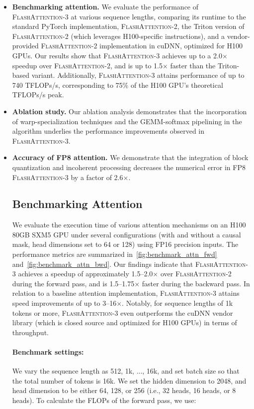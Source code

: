 \begin{algorithm}[H]
\begin{algorithmic}[1]
\begin{itemize}
\item \textbf{Benchmarking attention.} We evaluate the performance of \textsc{FlashAttention-3} at various sequence lengths, comparing its runtime to the standard PyTorch implementation, \textsc{FlashAttention-2}, the Triton version of \textsc{FlashAttention-2} (which leverages H100-specific instructions), and a vendor-provided \textsc{FlashAttention-2} implementation in cuDNN, optimized for H100 GPUs. Our results show that \textsc{FlashAttention-3} achieves up to a 2.0$\times$ speedup over \textsc{FlashAttention-2}, and is up to 1.5$\times$ faster than the Triton-based variant. Additionally, \textsc{FlashAttention-3} attains performance of up to 740 TFLOPs/s, corresponding to 75\% of the H100 GPU’s theoretical TFLOPs/s peak.
\item \textbf{Ablation study.} Our ablation analysis demonstrates that the incorporation of warp-specialization techniques and the GEMM-softmax pipelining in the algorithm underlies the performance improvements observed in \textsc{FlashAttention-3}.
\item \textbf{Accuracy of FP8 attention.} We demonstrate that the integration of block quantization and incoherent processing decreases the numerical error in FP8 \textsc{FlashAttention-3} by a factor of 2.6$\times$.

\subsection{Benchmarking Attention}
\label{subsec:benchmark_attn}

We evaluate the execution time of various attention mechanisms on an H100 80GB SXM5 GPU under several configurations (with and without a causal mask, head dimensions set to 64 or 128) using FP16 precision inputs. The performance metrics are summarized in~\cref{fig:benchmark_attn_fwd} and~\cref{fig:benchmark_attn_bwd}. Our findings indicate that \textsc{FlashAttention-3} achieves a speedup of approximately 1.5--2.0$\times$ over \textsc{FlashAttention-2} during the forward pass, and is 1.5--1.75$\times$ faster during the backward pass. In relation to a baseline attention implementation, \textsc{FlashAttention-3} attains speed improvements of up to 3--16$\times$. Notably, for sequence lengths of 1k tokens or more, \textsc{FlashAttention-3} even outperforms the cuDNN vendor library (which is closed source and optimized for H100 GPUs) in terms of throughput.

\paragraph{Benchmark settings:} We vary the sequence length as 512, 1k, ..., 16k, and set batch size so that the total number of tokens is 16k. We set the hidden dimension to 2048, and head dimension to be either 64, 128, or 256 (i.e., 32 heads, 16 heads, or 8 heads). To calculate the FLOPs of the forward pass, we use:


\end{itemize}
\end{algorithmic}
\end{algorithm}
